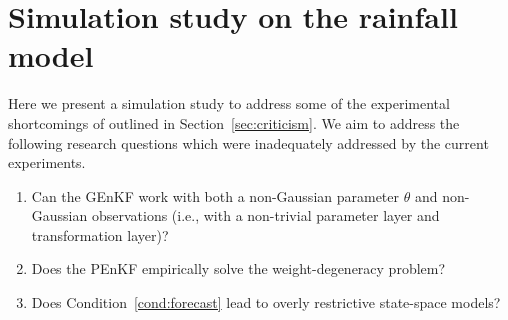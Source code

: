 \documentclass[12pt]{article}
\begin{document}
%


\section{Simulation study on the rainfall model}
Here we present a simulation study to address some of the experimental
shortcomings of \cite{katzfuss2020} outlined in Section~\ref{sec:criticism}. We aim to
address the following research questions which were inadequately addressed by
the current experiments.
\begin{enumerate}
    \item Can the GEnKF work with both a non-Gaussian parameter $\theta$
    and non-Gaussian observations (i.e., with a non-trivial parameter layer
    and transformation layer)?
    \item Does the PEnKF empirically solve the weight-degeneracy problem?
    \item Does Condition~\ref{cond:forecast} lead to overly restrictive
    state-space models?
\end{enumerate}
\end{document}
